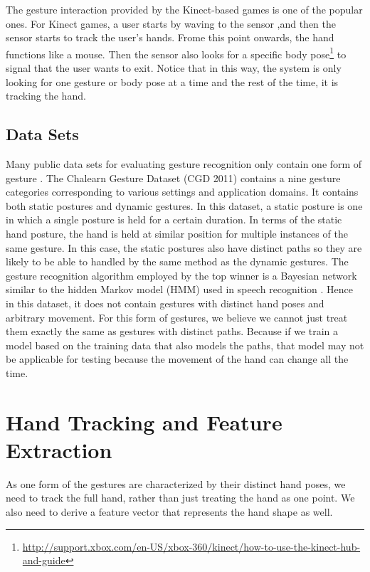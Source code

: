 \documentclass[conference]{IEEEtran}
\begin{document}
The gesture interaction provided by the Kinect-based games is
one of the popular ones. For Kinect games, a user starts by waving to the sensor
,and then the sensor starts to track the user's hands. Frome this point
onwards, the hand functions like a mouse. Then the sensor also looks for a specific
body
pose\footnote{\url{http://support.xbox.com/en-US/xbox-360/kinect/how-to-use-the-kinect-hub-and-guide}}
to signal that the user wants to exit.
Notice that in this way, the system is only looking for one gesture or body pose at a time and the rest of
the time, it is tracking the hand.

\subsection{Data Sets}
Many public data sets for evaluating gesture recognition only contain one form
of gesture \cite{Song11, Ruffieux2013, marcel99}. The Chalearn Gesture Dataset (CGD
2011) \cite{guyon13} contains a nine gesture categories corresponding to various settings and application domains.
 It contains both static postures and dynamic gestures. In this dataset, a static
posture is one in which a single posture is held for a certain duration. In
terms of the static hand posture, the hand is held at similar position for
multiple instances of the same gesture. In this case, the
static postures also have distinct paths so they are likely to be able to
handled by the same method as the dynamic gestures. The gesture recognition
algorithm employed by the top winner is a Bayesian network similar to the hidden
Markov model (HMM) used in speech recognition \cite{guyon13results}. Hence in
this dataset, it does not contain gestures with distinct hand poses and
arbitrary movement. For this form of gestures, we believe we cannot just
treat them exactly the same as gestures with distinct paths. Because if we train
a model based on the training data that also models the paths, that model may
not be applicable for testing because the movement of the hand can change all
the time.

\section{Hand Tracking and Feature Extraction}
As one form of the gestures are characterized by their distinct hand poses, we
need to track the full hand, rather than just treating the hand as one point. We
also need to derive a feature vector that represents the hand shape as well.
\end{document}
